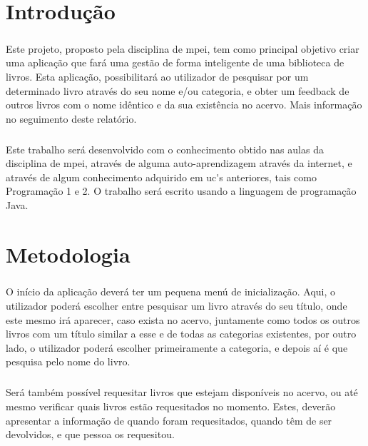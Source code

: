 \documentclass{report}
\begin{document}
\chapter{Introdução}
\label{chap.introducao}
\paragraph{} 
Este projeto, proposto pela disciplina de \acs{mpei}, tem como principal objetivo criar uma aplicação que fará uma gestão de forma inteligente de uma biblioteca de livros. Esta aplicação, possibilitará ao utilizador de pesquisar por um determinado livro através do seu nome e/ou categoria, e obter um feedback de outros livros com o nome idêntico e da sua existência no acervo. Mais informação no seguimento deste relatório.
\paragraph{}
Este trabalho será desenvolvido com o conhecimento obtido nas aulas da disciplina de \acs{mpei}, através de alguma auto-aprendizagem através da internet, e através de algum conhecimento adquirido em \acs{uc's} anteriores, tais como Programação 1 e 2. O trabalho será escrito usando a linguagem de programação Java.

\chapter{Metodologia}
\label{chap.metodologia}
\paragraph{}
O início da aplicação deverá ter um pequena menú de inicialização. Aqui, o utilizador poderá escolher entre pesquisar um livro através do seu título, onde este mesmo irá aparecer, caso exista no acervo, juntamente como todos os outros livros com um título similar a esse e de todas as categorias existentes, por outro lado, o utilizador poderá escolher primeiramente a categoria, e depois aí é que pesquisa pelo nome do livro.
\paragraph{}
Será também possível requesitar livros que estejam disponíveis no acervo, ou até mesmo verificar quais livros estão requesitados no momento. Estes, deverão apresentar a informação de quando foram requesitados, quando têm de ser devolvidos, e que pessoa os requesitou.
\end{document}
